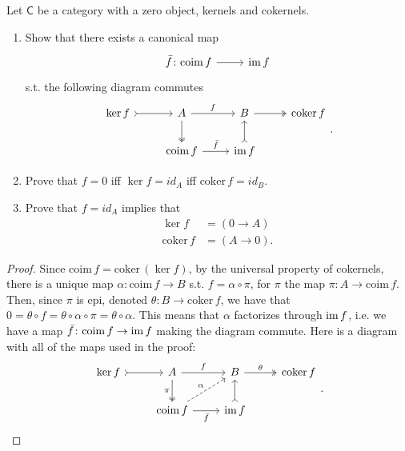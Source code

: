\documentclass[../Main]{subfiles}
\begin{document}
\begin{exr}
	Let $\mathsf{C}$ be a category with a zero object, kernels and cokernels.
	\begin{enumerate}
		\item Show that there exists a canonical map
			\begin{equation}
				\begin{tikzcd}
					\bar{f}\colon \mathrm{coim}\, f \arrow[r, "", rightarrow] &
				\ima f
				\end{tikzcd}
			\end{equation} 
			s.t. the following diagram commutes
			\begin{equation}
			\begin{tikzcd}
				\ker f \arrow[r, "", rightarrowtail] &
				A \arrow[r, "f", rightarrow] \arrow[d, "", twoheadrightarrow] &
				B \arrow[r, "", twoheadrightarrow] &
				\mathrm{coker}\, f\\
				&
				\mathrm{coim}\, f \arrow[r, "\bar{f}", rightarrow] &
				\ima f \arrow[u, "", rightarrowtail] &
			\end{tikzcd}
			.\end{equation} 
		\item Prove that $f = 0$ iff $\ker f = id_A$ iff
			$\mathrm{coker}\, f = id_B$.
		\item Prove that $f = id_A$ implies that
			\begin{align}
				\ker f &= \left( 0 \longrightarrow A \right)\\
				\mathrm{coker}\, f &= \left( A \longrightarrow 0 \right)
			.\end{align} 
	\end{enumerate}
\end{exr} 
\begin{proof}
	Since $\mathrm{coim}\, f = \mathrm{coker}\, \left( \ker f \right)$, 
	by the universal property of cokernels,
	there is a unique map $\alpha\colon \mathrm{coim}\, f \to B$ s.t.
	$f = \alpha \circ \pi$, for $\pi$ the map $\pi\colon A \to \mathrm{coim}\, f$.
	Then, since $\pi$ is epi, denoted $\theta\colon B \to \mathrm{coker}\, f$,
	we have that $0 = \theta \circ f = \theta \circ \alpha \circ \pi = \theta \circ \alpha$.
	This means that $\alpha$ factorizes through $\operatorname{im} f$, i.e.
	we have a map $\bar{f}\colon \mathrm{coim}\, f \to \operatorname{im} f$ making the diagram commute.
	Here is a diagram with all of the maps used in the proof:
			\begin{equation}
			\begin{tikzcd}
				\ker f \arrow[r, "", rightarrowtail] &
				A \arrow[r, "f", rightarrow] \arrow[d, "\pi"', twoheadrightarrow] &
				B \arrow[r, "\theta", twoheadrightarrow] &
				\mathrm{coker}\, f\\
				&
				\mathrm{coim}\, f \arrow[r, "\bar{f}"', rightarrow] 
				\arrow[ru, "\alpha", dashrightarrow] &
				\ima f \arrow[u, "", rightarrowtail]  &
			\end{tikzcd}\qedhere
			.\end{equation} 
\end{proof}
\end{document}
